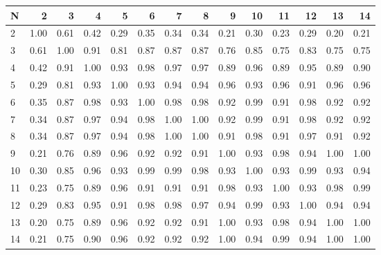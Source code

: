 \begin{tabular}{lrrrrrrrrrrrrr}
\toprule
N &    2  &    3  &    4  &    5  &    6  &    7  &    8  &    9  &    10 &    11 &    12 &    13 &    14 \\
\midrule
2  &  1.00 &  0.61 &  0.42 &  0.29 &  0.35 &  0.34 &  0.34 &  0.21 &  0.30 &  0.23 &  0.29 &  0.20 &  0.21 \\
3  &  0.61 &  1.00 &  0.91 &  0.81 &  0.87 &  0.87 &  0.87 &  0.76 &  0.85 &  0.75 &  0.83 &  0.75 &  0.75 \\
4  &  0.42 &  0.91 &  1.00 &  0.93 &  0.98 &  0.97 &  0.97 &  0.89 &  0.96 &  0.89 &  0.95 &  0.89 &  0.90 \\
5  &  0.29 &  0.81 &  0.93 &  1.00 &  0.93 &  0.94 &  0.94 &  0.96 &  0.93 &  0.96 &  0.91 &  0.96 &  0.96 \\
6  &  0.35 &  0.87 &  0.98 &  0.93 &  1.00 &  0.98 &  0.98 &  0.92 &  0.99 &  0.91 &  0.98 &  0.92 &  0.92 \\
7  &  0.34 &  0.87 &  0.97 &  0.94 &  0.98 &  1.00 &  1.00 &  0.92 &  0.99 &  0.91 &  0.98 &  0.92 &  0.92 \\
8  &  0.34 &  0.87 &  0.97 &  0.94 &  0.98 &  1.00 &  1.00 &  0.91 &  0.98 &  0.91 &  0.97 &  0.91 &  0.92 \\
9  &  0.21 &  0.76 &  0.89 &  0.96 &  0.92 &  0.92 &  0.91 &  1.00 &  0.93 &  0.98 &  0.94 &  1.00 &  1.00 \\
10 &  0.30 &  0.85 &  0.96 &  0.93 &  0.99 &  0.99 &  0.98 &  0.93 &  1.00 &  0.93 &  0.99 &  0.93 &  0.94 \\
11 &  0.23 &  0.75 &  0.89 &  0.96 &  0.91 &  0.91 &  0.91 &  0.98 &  0.93 &  1.00 &  0.93 &  0.98 &  0.99 \\
12 &  0.29 &  0.83 &  0.95 &  0.91 &  0.98 &  0.98 &  0.97 &  0.94 &  0.99 &  0.93 &  1.00 &  0.94 &  0.94 \\
13 &  0.20 &  0.75 &  0.89 &  0.96 &  0.92 &  0.92 &  0.91 &  1.00 &  0.93 &  0.98 &  0.94 &  1.00 &  1.00 \\
14 &  0.21 &  0.75 &  0.90 &  0.96 &  0.92 &  0.92 &  0.92 &  1.00 &  0.94 &  0.99 &  0.94 &  1.00 &  1.00 \\
\bottomrule
\end{tabular}
